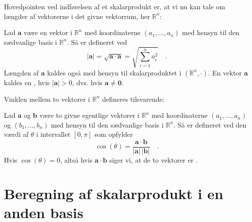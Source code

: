 Hovedpointen ved indførelsen af et skalarprodukt er, at vi nu kan tale om længder af vektorerne i det givne  vektorrum, her $\mathbb{R}^{n}$:

\begin{definition}
Lad $\mathbf{a}$ være en vektor i $\mathbb{R}^{n}$ med koordinaterne $(a_{1}, . . . , a_{n})$ med hensyn til den sædvanlige basis i $\mathbb{R}^{n}$. Så er  defineret ved
\begin{equation}
\vert \mathbf{a} \vert = \sqrt{\mathbf{a} \cdot \mathbf{a}} = \sqrt{\sum_{i=1}^{n}a_{i}^{2}} \quad.
\end{equation}
Længden af $\mathbf{a}$ kaldes også  med hensyn til skalarproduktet i $(\mathbb{R}^{n}, \cdot)$.
En vektor $\mathbf{a}$ kaldes en , hvis $\vert \mathbf{a} \vert > 0$, dvs. hvis $ \mathbf{a} \neq \mathbf{0}$.
\end{definition}

Vinklen mellem to vektorer i $\mathbb{R}^{n}$ defineres tilsvarende:

\begin{definition}
Lad  $\mathbf{a}$ og $\mathbf{b}$ være to givne egentlige vektorer i $\mathbb{R}^{n}$ med koordinaterne $(a_{1}, . . . , a_{n})$ og $(b_{1}, . . . , b_{n})$ med hensyn til den sædvanlige basis i $\mathbb{R}^{n}$. Så er  defineret ved den værdi af $\theta$ i intervallet $[0, \pi]$ som opfylder
\begin{equation}
\cos(\theta) = \frac{\mathbf{a} \cdot \mathbf{b}}{\vert \mathbf{a} \vert \, \vert \mathbf{b} \vert} \quad.
\end{equation}
Hvis $\cos(\theta) = 0$, altså hvis $\mathbf{a} \cdot \mathbf{b}$ siger vi, at de to vektorer er .
\end{definition}



\section{Beregning af skalarprodukt i en anden basis} \label{secSkalarBeregnNyBasis}

